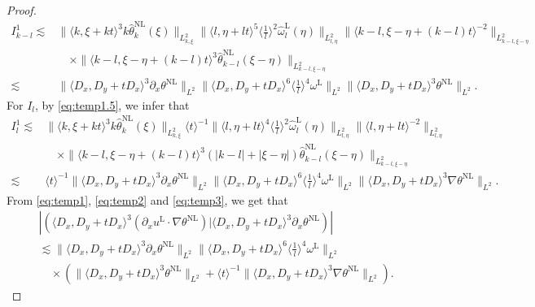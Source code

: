 \documentclass[reqno, 12pt]{amsart} %
\theoremstyle{plain} %
\theoremstyle{definition}
\theoremstyle{remark}
\numberwithin{equation}{section} %
\newcommand{\no}{\nonumber}
\newcommand{\px}{\partial_x}
\begin{document}
\begin{proof}
\begin{equation}
\begin{aligned}
				I_{k-l}^1 \lesssim & \|\langle k, \xi+k t\rangle^3 k\hat{\theta}_k^{\mathrm{NL}}(\xi)\|_{L_{k, \xi}^2}\|\langle l, \eta+l t\rangle^5 \langle\frac{1}{l}\rangle^2 \hat{\omega}_l^{\mathrm{L}}(\eta)\|_{L_{l, \eta}^2}  \|\langle k-l, \xi-\eta+(k-l) t\rangle^{-2}\|_{L_{k-l, \xi-\eta}^2} \\
				& \quad \times\|\langle k-l, \xi-\eta+(k-l) t\rangle^3 \hat{\theta}_{k-l}^{\mathrm{NL}}(\xi-\eta)\|_{L_{k-l, \xi-\eta}^2} \\
				\lesssim &   \|\langle D_x, D_y+t D_x\rangle^3 \px \theta^{\mathrm{NL}}\|_{L^2}  \|\langle D_x, D_y+t D_x\rangle^6  \langle\frac{1}{l}\rangle^4  \omega^{\mathrm{L}}\|_{L^2}     \|\langle D_x, D_y+t D_x\rangle^3 \theta^{\mathrm{NL}}\|_{L^2}.
		\end{aligned}\end{equation}
		For $I_{l}$, by \eqref{eq:temp1.5}, we infer that
		\begin{equation}\begin{aligned} \label{eq:temp3}
				I_{l}^1 \lesssim & \|\langle k, \xi+k t\rangle^3 k\hat{\theta}_k^{\mathrm{NL}}(\xi)\|_{L_{k, \xi}^2}   \langle t \rangle^{-1} \|\langle l, \eta+l t\rangle^4 \langle\frac{1}{l}\rangle^2 \hat{\omega}_l^{\mathrm{L}}(\eta)\|_{L_{l, \eta}^2}  \|\langle l, \eta + l t\rangle^{-2}\|_{L_{l, \eta}^2} \\
				& \quad \times\|\langle k-l, \xi-\eta+(k-l) t\rangle^3 \left(|k-l|+|\xi-\eta|\right) \hat{\theta}_{k-l}^{\mathrm{NL}}(\xi-\eta)\|_{L_{k-l, \xi-\eta}^2} \\
				\lesssim & \langle t \rangle^{-1}  \|\langle D_x, D_y+t D_x\rangle^3 \px \theta^{\mathrm{NL}}\|_{L^2}  \|\langle D_x, D_y+t D_x\rangle^6  \langle\frac{1}{l}\rangle^4  \omega^{\mathrm{L}}\|_{L^2}     \|\langle D_x, D_y+t D_x\rangle^3 \nabla \theta^{\mathrm{NL}}\|_{L^2}.
		\end{aligned}\end{equation}
		From \eqref{eq:temp1}, \eqref{eq:temp2} and \eqref{eq:temp3}, we get that
		\begin{align} \label{eq:5}
			&\no\left|\left(\langle D_x, D_y+t D_x\rangle^3( \px u^{\mathrm{L}} \cdot \nabla \theta^{\mathrm{NL}}) \big| \langle D_x, D_y+t D_x\rangle^3 \px \theta^{\mathrm{NL}}\right)\right|\\
			&\no\lesssim \|\langle D_x, D_y+t D_x\rangle^3 \px \theta^{\mathrm{NL}}\|_{L^2}  \|\langle D_x, D_y+t D_x\rangle^6  \langle\frac{1}{l}\rangle^4  \omega^{\mathrm{L}}\|_{L^2}  \\
			&\quad \times   \left(\|\langle D_x, D_y+t D_x\rangle^3 \theta^{\mathrm{NL}}\|_{L^2}  + \langle t \rangle^{-1} \|\langle D_x, D_y+t D_x\rangle^3 \nabla \theta^{\mathrm{NL}}\|_{L^2} \right).
		\end{align}
		

\end{proof}
\end{document}
